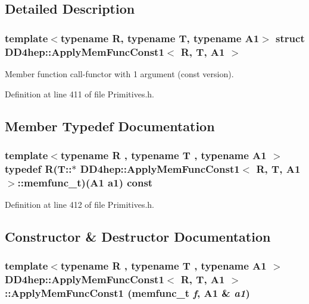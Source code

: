 \subsection{Detailed Description}
\subsubsection*{template$<$typename R, typename T, typename A1$>$ struct DD4hep::ApplyMemFuncConst1$<$ R, T, A1 $>$}

Member function call-\/functor with 1 argument (const version). 

Definition at line 411 of file Primitives.h.

\subsection{Member Typedef Documentation}
\hypertarget{struct_d_d4hep_1_1_apply_mem_func_const1_a30e39ab48987d05108801d516f6793c5}{
\subsubsection[{memfunc\_\-t}]{\setlength{\rightskip}{0pt plus 5cm}template$<$typename R , typename T , typename A1 $>$ typedef R(T::$\ast$ {\bf DD4hep::ApplyMemFuncConst1}$<$ R, {\bf T}, A1 $>$::{\bf memfunc\_\-t})(A1 a1) const }}
\label{struct_d_d4hep_1_1_apply_mem_func_const1_a30e39ab48987d05108801d516f6793c5}


Definition at line 412 of file Primitives.h.

\subsection{Constructor \& Destructor Documentation}
\hypertarget{struct_d_d4hep_1_1_apply_mem_func_const1_a57b70099e8c5677710a247320b79c91c}{
\subsubsection[{ApplyMemFuncConst1}]{\setlength{\rightskip}{0pt plus 5cm}template$<$typename R , typename T , typename A1 $>$ {\bf DD4hep::ApplyMemFuncConst1}$<$ R, {\bf T}, A1 $>$::{\bf ApplyMemFuncConst1} ({\bf memfunc\_\-t} {\em f}, \/  A1 \& {\em a1})}}
\label{struct_d_d4hep_1_1_apply_mem_func_const1_a57b70099e8c5677710a247320b79c91c}


